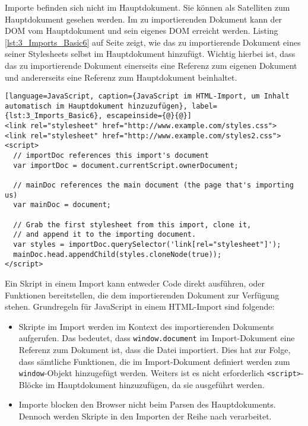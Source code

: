 Importe befinden sich nicht im Hauptdokument. Sie können als Satelliten zum Hauptdokument gesehen werden. Im zu importierenden Dokument kann der DOM vom Hauptdokument und sein eigenes DOM erreicht werden. Listing \ref{lst:3_Imports_Basic6} auf Seite \pageref{lst:3_Imports_Basic6} zeigt, wie das zu importierende Dokument eines seiner Stylesheets selbst im Hauptdokument hinzufügt. Wichtig hierbei ist, dass das zu importierende Dokument einerseits eine Referenz zum eigenen Dokument und andererseits eine Referenz zum Hauptdokument beinhaltet.

\begin{lstlisting}[language=JavaScript, caption={JavaScript im HTML-Import, um Inhalt automatisch im Hauptdokument hinzuzufügen}, label={lst:3_Imports_Basic6}, escapeinside={@}{@}]
<link rel="stylesheet" href="http://www.example.com/styles.css">
<link rel="stylesheet" href="http://www.example.com/styles2.css">
<script>
  // importDoc references this import's document
  var importDoc = document.currentScript.ownerDocument;

  // mainDoc references the main document (the page that's importing us)
  var mainDoc = document;

  // Grab the first stylesheet from this import, clone it,
  // and append it to the importing document.
  var styles = importDoc.querySelector('link[rel="stylesheet"]');
  mainDoc.head.appendChild(styles.cloneNode(true));
</script>
\end{lstlisting}

Ein Skript in einem Import kann entweder Code direkt ausführen, oder Funktionen bereitstellen, die dem importierenden Dokument zur Verfügung stehen. Grundregeln für JavaScript in einem HTML-Import sind folgende:
\begin{itemize}
\item Skripte im Import werden im Kontext des importierenden Dokuments aufgerufen. Das bedeutet, dass \lstinline|window.document| im Import-Dokument eine Referenz zum Dokument ist, dass die Datei importiert. Dies hat zur Folge, dass sämtliche Funktionen, die im Import-Dokument definiert werden zum \lstinline|window|-Objekt hinzugefügt werden. Weiters ist es nicht erforderlich \lstinline|<script>|-Blöcke im Hauptdokument hinzuzufügen, da sie ausgeführt werden.
\item Importe blocken den Browser nicht beim Parsen des Hauptdokuments. Dennoch werden Skripte in den Importen der Reihe nach verarbeitet.
\end{itemize}

